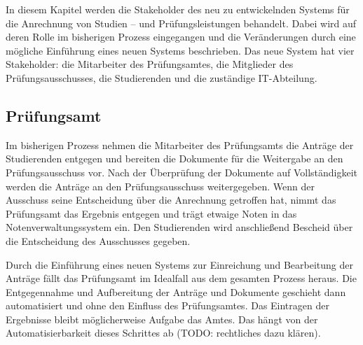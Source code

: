 \documentclass[ngerman]{tudscrreprt}
\begin{document}
In diesem Kapitel werden die Stakeholder des neu zu entwickelnden Systems für die Anrechnung von Studien – und Prüfungsleistungen behandelt. Dabei wird auf deren Rolle im bisherigen Prozess eingegangen und die Veränderungen durch eine mögliche Einführung eines neuen Systems beschrieben. Das neue System hat vier Stakeholder: die Mitarbeiter des Prüfungsamtes, die Mitglieder des Prüfungsausschusses, die Studierenden und die zuständige IT-Abteilung.



\subsection{Prüfungsamt}

Im bisherigen Prozess nehmen die Mitarbeiter des Prüfungsamts die Anträge der Studierenden entgegen und bereiten die Dokumente für die Weitergabe an den Prüfungsausschuss vor. Nach der Überprüfung der Dokumente auf Vollständigkeit werden die Anträge an den Prüfungsausschuss weitergegeben. Wenn der Ausschuss seine Entscheidung über die Anrechnung getroffen hat, nimmt das Prüfungsamt das Ergebnis entgegen und trägt etwaige Noten in das Notenverwaltungssystem ein. Den Studierenden wird anschließend Bescheid über die Entscheidung des Ausschusses gegeben.

Durch die Einführung eines neuen Systems zur Einreichung und Bearbeitung der Anträge fällt das Prüfungsamt im Idealfall aus dem gesamten Prozess heraus. Die Entgegennahme und Aufbereitung der Anträge und Dokumente geschieht dann automatisiert und ohne den Einfluss des Prüfungsamtes. Das Eintragen der Ergebnisse bleibt möglicherweise Aufgabe das Amtes. Das hängt von der Automatisierbarkeit dieses Schrittes ab (TODO: rechtliches dazu klären).
\end{document}
